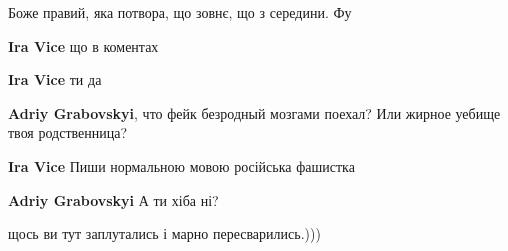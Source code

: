\begin{itemize}
Боже правий, яка потвора, що зовнє, що з середини. Фу

\begin{itemize}
 
\textbf{Ira Vice} що в коментах

 
\textbf{Ira Vice} ти да

 
\textbf{Adriy Grabovskyi}, что фейк безродный мозгами поехал? Или жирное уебище твоя родственница?

 
\textbf{Ira Vice} Пиши нормальною мовою російська фашистка

 
\textbf{Adriy Grabovskyi} А ти хіба ні?

 
щось ви тут заплутались і марно пересварились.)))
\end{itemize}

 

\end{itemize}
